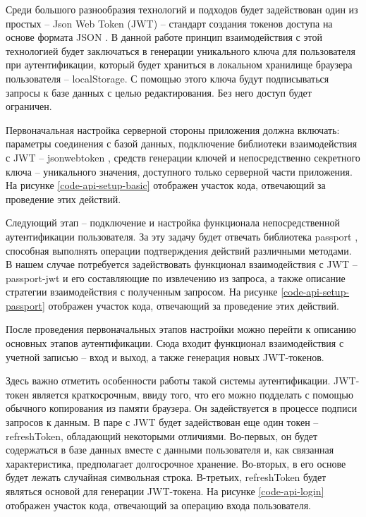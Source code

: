 Среди большого разнообразия технологий и подходов будет задействован один из простых -- Json Web Token (JWT) \cite{jwt} -- стандарт создания токенов доступа на основе формата JSON \cite{wiki-json}. 
В данной работе принцип взаимодействия с этой технологией будет заключаться в генерации уникального ключа для пользователя при аутентификации, который будет храниться в локальном хранилище браузера пользователя -- localStorage.
С помощью этого ключа будут подписываться запросы к базе данных с целью редактирования.
Без него доступ будет ограничен.

Первоначальная настройка серверной стороны приложения должна включать: параметры соединения с базой данных, подключение библиотеки взаимодействия с JWT -- jsonwebtoken  \cite{npm-jsonwebtoken}, средств генерации ключей и непосредственно секретного ключа -- уникального значения, доступного только серверной части приложения.
На рисунке \ref{code-api-setup-basic} отображен участок кода, отвечающий за проведение этих действий.


Следующий этап -- подключение и настройка функционала непосредственной аутентификации пользователя.
За эту задачу будет отвечать библиотека passport \cite{npm-passport}, способная выполнять операции подтверждения действий различными методами.
В нашем случае потребуется задействовать функционал взаимодействия с JWT -- passport-jwt и его составляющие по извлечению из запроса, а также описание стратегии взаимодействия с полученным запросом.
На рисунке \ref{code-api-setup-passport} отображен участок кода, отвечающий за проведение этих действий.


После проведения первоначальных этапов настройки можно перейти к описанию основных этапов аутентификации.
Сюда входит функционал взаимодействия с учетной записью -- вход и выход, а также генерация новых JWT-токенов.

Здесь важно отметить особенности работы такой системы аутентификации.
JWT-токен является краткосрочным, ввиду того, что его можно подделать с помощью обычного копирования из памяти браузера.
Он задействуется в процессе подписи запросов к данным.
В паре с JWT будет задействован еще один токен -- refreshToken, обладающий некоторыми отличиями.
Во-первых, он будет содержаться в базе данных вместе с данными пользователя и, как связанная характеристика, предполагает долгосрочное хранение.
Во-вторых, в его основе будет лежать случайная символьная строка.
В-третьих, refreshToken будет являться основой для генерации JWT-токена.
На рисунке \ref{code-api-login} отображен участок кода, отвечающий за операцию входа пользователя.

